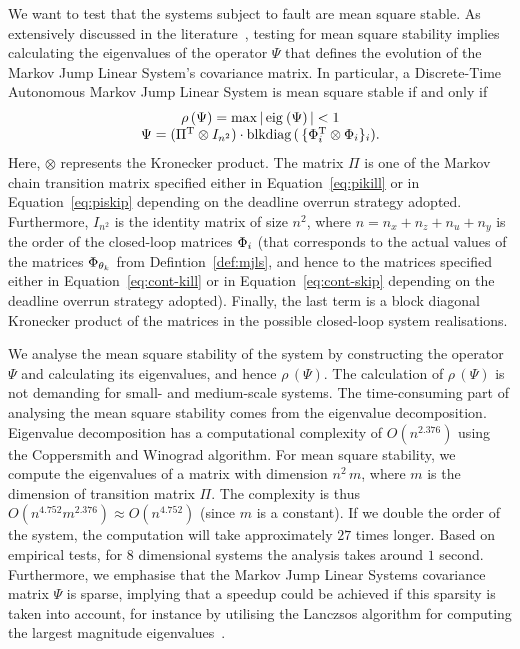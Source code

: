 We want to test that the systems subject to fault are mean square stable.
As extensively discussed in the literature~\cite{Costa:2005}, testing for mean square stability implies calculating the eigenvalues of the operator $\Psi$ that defines the evolution of the Markov Jump Linear System's covariance matrix.
In particular, a Discrete-Time Autonomous Markov Jump Linear System is mean square stable if and only if 
\begin{equation}%
    \label{eq:stab-notion}%
    \begin{matrix}
        \rho\,(\Psi) = \max{\abs{\,\eig{}{\Psi}\,}} < 1 \\
        \Psi = (\Pi^\T \otimes I_{n^2}) \cdot \text{blkdiag}\,(\,\{ \clmat_{i}^\T \otimes \clmat_{i} \}_{i} ).
    \end{matrix}
\end{equation}
Here, $\otimes$ represents the Kronecker product.
The matrix $\Pi$ is one of the Markov chain transition matrix specified either in Equation~\eqref{eq:pikill} or in Equation~\eqref{eq:piskip} depending on the deadline overrun strategy adopted.
Furthermore, $I_{n^2}$ is the identity matrix of size $n^2$, where $n = n_x + n_z + n_u + n_y$ is the order of the closed-loop matrices $\Phi_{i}$ (that corresponds to the actual values of the matrices $\Phi_{\theta_k}$ from Defintion~\ref{def:mjls}, and hence to the matrices specified either in Equation~\eqref{eq:cont-kill} or in Equation~\eqref{eq:cont-skip} depending on the deadline overrun strategy adopted).
Finally, the last term is a block diagonal Kronecker product of the matrices in the possible closed-loop system realisations.

We analyse the mean square stability of the system by constructing the operator $\Psi$ and calculating its eigenvalues, and hence $\rho\,(\Psi)$.
The calculation of $\rho\,(\Psi)$ is not demanding for small- and medium-scale systems.
The time-consuming part of analysing the mean square stability comes from the eigenvalue decomposition.
Eigenvalue decomposition has a computational complexity of 
$O(n^{2.376})$ using the Coppersmith and Winograd algorithm.
For mean square stability, we compute the eigenvalues of a matrix with dimension $n^2\,m$, where $m$ is the dimension of transition matrix $\Pi$.
The complexity is thus $O(n^{4.752}m^{2.376}) \approx O(n^{4.752})$ (since $m$ is a constant).
If we double the order of the system, the computation will take approximately $27$ times longer.
Based on empirical tests, for $8$ dimensional systems the analysis takes around $1$ second.
Furthermore, we emphasise that the Markov Jump Linear Systems covariance matrix $\Psi$ is sparse, implying that a speedup could be achieved if this sparsity is taken into account, for instance by utilising the Lanczsos algorithm for computing the largest magnitude eigenvalues~\cite{Golub:1996}.
